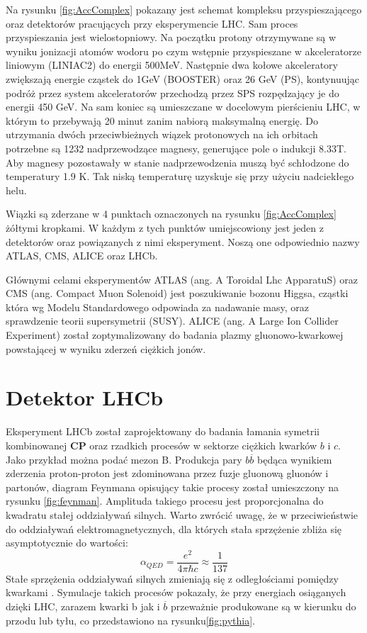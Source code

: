 Na rysunku \ref{fig:AccComplex} pokazany jest schemat kompleksu przyspieszającego oraz detektorów pracujących przy eksperymencie LHC. Sam proces przyspieszania jest wielostopniowy\cite{Haefeli}.
Na początku protony otrzymywane są w wyniku jonizacji atomów wodoru po czym wstępnie przyspieszane w akceleratorze liniowym (LINIAC2) do energii 500MeV. Następnie dwa kołowe akceleratory zwiększają energie cząstek do 1GeV (BOOSTER) oraz 26 GeV (PS), kontynuując podróż przez system akceleratorów  przechodzą przez SPS rozpędzający je do energii 450 GeV. Na sam koniec są umieszczane w docelowym pierścieniu LHC, w którym to przebywają 20 minut zanim nabiorą maksymalną energię. Do utrzymania dwóch przeciwbieżnych wiązek protonowych na ich orbitach potrzebne są 1232 nadprzewodzące magnesy, generujące pole o indukcji 8.33T. Aby magnesy pozostawały w stanie nadprzewodzenia muszą być schłodzone do temperatury 1.9 K. Tak niską temperaturę uzyskuje się przy użyciu nadciekłego helu. 

Wiązki są zderzane w 4 punktach oznaczonych na rysunku \ref{fig:AccComplex} żółtymi kropkami. W każdym z tych punktów umiejscowiony jest jeden z detektorów oraz powiązanych z nimi eksperyment. Noszą one odpowiednio nazwy ATLAS, CMS, ALICE oraz LHCb.

Głównymi celami eksperymentów ATLAS (ang. A Toroidal Lhc ApparatuS)\cite{ATLAS} oraz CMS (ang. Compact Muon Solenoid) \cite{CMS} jest poszukiwanie bozonu Higgsa, cząstki która wg Modelu Standardowego odpowiada za nadawanie masy, oraz sprawdzenie teorii supersymetrii (SUSY). ALICE (ang. A Large Ion Collider Experiment)\cite{ALICE} został zoptymalizowany do badania plazmy gluonowo-kwarkowej powstającej w wyniku zderzeń ciężkich jonów.


\section{Detektor LHCb}
Eksperyment LHCb został zaprojektowany do badania łamania symetrii kombinowanej \textbf{CP} oraz rzadkich procesów w sektorze ciężkich kwarków $b$ i $c$. Jako przykład można podać mezon B. Produkcja pary $b\overline{b}$ będąca wynikiem zderzenia proton-proton jest zdominowana przez fuzje gluonową  gluonów i partonów, diagram Feynmana opisujący takie procesy został umieszczony na rysunku \ref{fig:feynman}.
 Amplituda takiego procesu jest proporcjonalna do kwadratu stałej oddziaływań silnych. Warto zwrócić uwagę, że w przeciwieństwie do oddziaływań elektromagnetycznych, dla których stała sprzężenie zbliża się asymptotycznie do wartości:
 \begin{equation}
 \alpha_{QED}=\frac{e^2}{4\pi \hbar c}\approx \frac{1}{137} 
 \end{equation}
Stałe sprzężenia oddziaływań silnych zmieniają się z odległościami pomiędzy kwarkami \cite{perkins}. Symulacje takich procesów pokazały, że przy energiach osiąganych dzięki LHC, zarazem kwarki b jak i  $\overline{b}$ przeważnie produkowane są w kierunku do przodu lub tyłu, co przedstawiono na rysunku\ref{fig:pythia}.  


